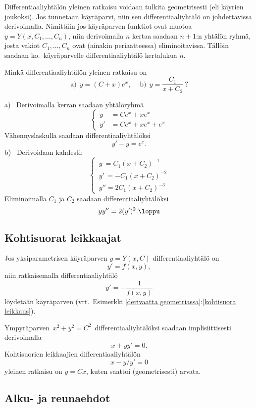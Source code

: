 Differentiaaliyhtälön yleinen ratkaisu voidaan tulkita geometrisesti  
(eli käyrien joukoksi). Jos tunnetaan käyräparvi, niin sen differentiaaliyhtälö on 
johdettavissa derivoimalla. Nimittäin jos käyräparven funktiot ovat muotoa 
$y=Y(x,C_1,\ldots,C_n)$, niin derivoimalla $n$ kertaa saadaan $n+1$:n yhtälön ryhmä, josta 
vakiot $C_1,\ldots,C_n$ ovat (ainakin periaatteessa) eliminoitavissa. Tällöin saadaan ko.\ 
käyräparvelle differentiaaliyhtälö kertalukua $n$.
\begin{Exa}
Minkä differentiaaliyhtälön yleinen ratkaisu on 
\[ 
\text{a)}\ \ y=(C+x)e^x, \quad\ \text{b)}\ \ y=\frac{C_1}{x+C_2}\ ? 
\]
\end{Exa}
\ratk a) \ Derivoimalla kerran saadaan yhtälöryhmä
\[
\left\{
\begin{aligned}
y &=Ce^x+xe^x \\
y'&=Ce^x+xe^x+e^x
\end{aligned}
\right.
\]
Vähennyslaskulla saadaan differentiaaliyhtälöksi
\[
y'-y=e^x.
\]
b) \ Derivoidaan kahdesti:
\[
\begin{cases}
\,y\  =C_1(x+C_2)^{-1} \\
\,y'\,=-C_1(x+C_2)^{-2} \\
\,y'' =2C_1(x+C_2)^{-3}
\end{cases}
\]
Eliminoimalla $C_1$ ja $C_2$ saadaan differentiaaliyhtälöksi
\[
yy''=2(y')^2. \loppu
\]

\subsection*{Kohtisuorat leikkaajat}

Jos yksiparametrisen käyräparven $y=Y(x,C)$ differentiaaliyhtälö on 
\[ 
y'=f(x,y), 
\] 
niin ratkaisemalla differentiaaliyhtälö
\[ 
y'=-\frac{1}{f(x,y)} 
\]
löydetään käyräparven 
(vrt.\ Esimerkki \ref{derivaatta geometriassa}:\ref{kohtisuora leikkaus}).
\begin{Exa}
Ympyräparven $\,x^2+y^2=C^2\,$ differentiaaliyhtälöksi saadaan implisiittisesti derivoimalla
\[
x+yy'=0.
\]
Kohtisuorien leikkaajien differentiaaliyhtälön
\[
x-y/y'=0
\]
yleinen ratkaisu on $y=Cx$, kuten saattoi (geometrisesti) arvata. \loppu
\end{Exa}

\subsection*{Alku- ja reunaehdot}

